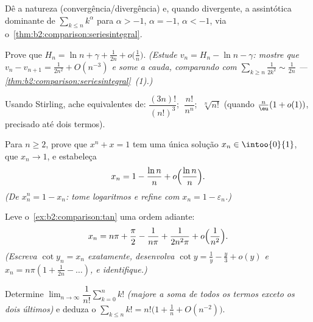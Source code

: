 \begin{exercise}[$\star$]\label{exo:b2:comparison:2}
Dê a natureza (convergência/divergência) e, quando divergente, a
assintótica dominante de $\sum_{k \leq n} k^\alpha$ para $\alpha >
-1$, $\alpha = -1$, $\alpha < -1$, via
o~\cref{thm:b2:comparison:seriesintegral}.
\end{exercise}

\begin{exercise}[$\star\star$]\label{exo:b2:comparison:3}
Prove que $H_n = \ln n + \gamma + \frac{1}{2n} + o\bigl(\frac1n\bigr)$.
\emph{(Estude $v_n = H_n - \ln n - \gamma$: mostre que $v_n - v_{n+1} =
\frac{1}{2n^2} + O(n^{-3})$ e some a cauda, comparando com
$\sum_{k \geq n} \frac{1}{2k^2} \sim \frac{1}{2n}$ ---
\cref{thm:b2:comparison:seriesintegral}~(1).)}
\end{exercise}

\begin{exercise}[$\star\star$]\label{exo:b2:comparison:4}
Usando Stirling, ache equivalentes de: $\dfrac{(3n)!}{(n!)^3}$;
$\;\dfrac{n!}{n^n}$; $\;\sqrt[n]{n!}$ (quando $\frac n\eu(1 + o(1))$,
precisado até dois termos).
\end{exercise}

\begin{exercise}[$\star\star$]\label{exo:b2:comparison:5}
Para $n \geq 2$, prove que $x^n + x = 1$ tem uma única solução $x_n
\in \intoo{0}{1}$, que $x_n \to 1$, e estabeleça
\[
x_n = 1 - \frac{\ln n}{n} + o\Bigl(\frac{\ln n}{n}\Bigr).
\]
\emph{(De $x_n^n = 1 - x_n$: tome logaritmos e refine com
$x_n = 1 - \varepsilon_n$.)}
\end{exercise}

\begin{exercise}[$\star\star$]\label{exo:b2:comparison:6}
Leve o~\cref{ex:b2:comparison:tan} uma ordem adiante:
\[
x_n = n\pi + \frac\pi2 - \frac{1}{n\pi} + \frac{1}{2n^2\pi} +
o\Bigl(\frac{1}{n^2}\Bigr).
\]
\emph{(Escreva $\cot y_n = x_n$ exatamente, desenvolva $\cot y = \frac1y -
\frac y3 + o(y)$ e $x_n = n\pi(1 + \frac{1}{2n} - \dots)$, e
identifique.)}
\end{exercise}

\begin{exercise}[$\star\star$]\label{exo:b2:comparison:7}
Determine $\lim_{n\to\infty} \dfrac{1}{n!}\sum_{k=0}^{n} k!$
\emph{(majore a soma de todos os termos exceto os dois últimos)} e deduza o
 $\sum_{k \leq n} k! = n!\bigl(1 + \frac1n +
O(n^{-2})\bigr)$.
\end{exercise}

